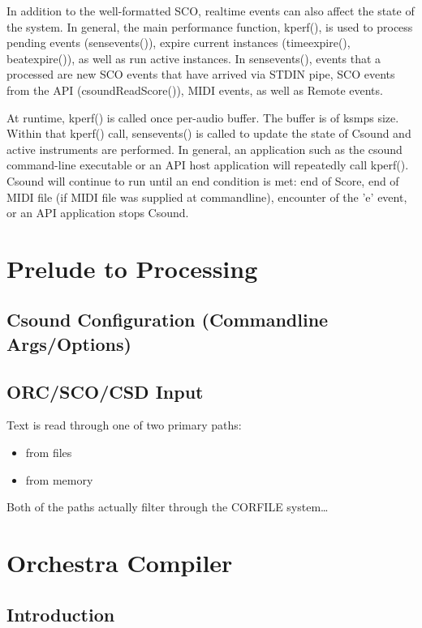 \documentclass[]{book}
\begin{document}
In addition to the well-formatted SCO, realtime events can also affect the state of the system.  In general, the main performance function, kperf(), is used to process pending events (sensevents()), expire current instances (timeexpire(), beatexpire()), as well as run active instances.  In sensevents(), events that a processed are new SCO events that have arrived via STDIN pipe, SCO events from the API (csoundReadScore()), MIDI events, as well as Remote events.

At runtime, kperf() is called once per-audio buffer.  The buffer is of ksmps size.  Within that kperf() call, sensevents() is called to update the state of Csound and active instruments are performed.  In general, an application such as the csound command-line executable or an API host application will repeatedly call kperf().  Csound will continue to run until an end condition is met: end of Score, end of MIDI file (if MIDI file was supplied at commandline), encounter of the 'e' event, or an API application stops Csound.  

\chapter{Prelude to Processing}

\section{Csound Configuration (Commandline Args/Options)}

\section{ORC/SCO/CSD Input}

Text is read through one of two primary paths:

\begin{itemize}
\itemsep1pt\parskip0pt
\item
  from files
\item
  from memory
\end{itemize}

Both of the paths actually filter through the CORFILE system\ldots{}

\chapter{Orchestra Compiler}

\section{Introduction}
\end{document}
